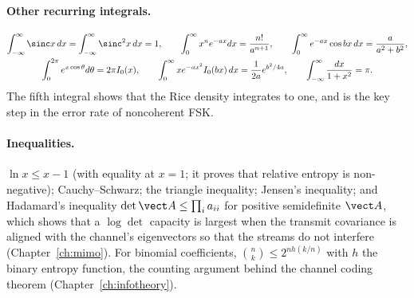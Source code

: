 \paragraph{Other recurring integrals.}
\begin{gather}
\int_{-\infty}^{\infty}\sinc x\,dx=\int_{-\infty}^{\infty}\sinc^2x\,dx=1,\qquad
\int_0^\infty x^ne^{-ax}dx=\frac{n!}{a^{n+1}},\qquad
\int_0^\infty e^{-ax}\cos bx\,dx=\frac{a}{a^2+b^2},\\
\int_0^{2\pi}e^{x\cos\theta}d\theta=2\pi I_0(x),\qquad
\int_0^\infty xe^{-ax^2}I_0(bx)\,dx=\frac{1}{2a}e^{b^2/4a},\qquad
\int_{-\infty}^{\infty}\frac{dx}{1+x^2}=\pi.
\end{gather}
The fifth integral shows that the Rice density integrates to one, and is the key step in the
error rate of noncoherent FSK.


\paragraph{Inequalities.} $\ln x\le x-1$ (with equality at $x=1$; it proves that relative entropy
is non-negative); Cauchy--Schwarz; the triangle inequality; Jensen's inequality; and
Hadamard's inequality $\det\vect A\le\prod_ia_{ii}$ for positive semidefinite $\vect A$, which
shows that a $\log\det$ capacity is largest when the transmit covariance is aligned with the
channel's eigenvectors so that the streams do not interfere (Chapter~\ref{ch:mimo}). For binomial
coefficients, $\binom nk\le2^{nh(k/n)}$ with $h$ the binary entropy function, the counting
argument behind the channel coding theorem (Chapter~\ref{ch:infotheory}).

